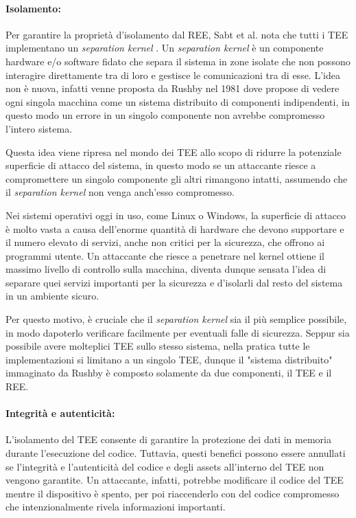 \documentclass[12pt,italian]{report}
\begin{document}
\paragraph{Isolamento:}
Per garantire la proprietà d'isolamento dal REE,
Sabt et al.\cite{sabt2015tee} nota
che tutti i TEE implementano un \textit{separation kernel}
\cite{rushby1981separationkernel}. 
Un \textit{separation kernel} è un componente hardware e/o software fidato che
separa il sistema in zone isolate che non possono
interagire direttamente tra di loro e gestisce le comunicazioni tra di esse.
L'idea non è nuova, infatti venne proposta da Rushby nel 1981 dove propose
di vedere ogni singola macchina come un sistema distribuito di componenti
indipendenti, in questo modo un errore in un singolo componente non avrebbe
compromesso l'intero sistema.

Questa idea viene ripresa nel mondo dei TEE allo scopo di ridurre la
potenziale superficie di attacco del sistema, in questo modo se un
attaccante riesce a compromettere un singolo componente gli altri rimangono
intatti, assumendo che il \textit{separation kernel} non venga anch'esso
compromesso.

Nei sistemi operativi oggi in uso, come Linux o Windows, la superficie di
attacco è molto vasta a causa dell'enorme quantità di hardware che devono
supportare e il numero elevato di servizi, anche non critici per la sicurezza,
che offrono ai programmi utente. 
Un attaccante che riesce a penetrare nel kernel ottiene il massimo livello di
controllo sulla macchina, diventa dunque sensata l'idea di separare quei
servizi importanti per la sicurezza e d'isolarli dal resto del sistema in
un ambiente sicuro.

Per questo motivo, è cruciale che il \textit{separation kernel} sia
il più semplice possibile, in modo dapoterlo verificare facilmente per
eventuali falle di sicurezza.
Seppur sia possibile avere molteplici TEE sullo stesso sistema, nella pratica
tutte le implementazioni si limitano a un singolo TEE, dunque il
"sistema distribuito" immaginato da Rushby è composto solamente da due
componenti, il TEE e il REE.

\paragraph{Integrità e autenticità:}
L'isolamento del TEE consente di garantire la protezione dei dati
in memoria durante l'esecuzione del codice.
Tuttavia, questi benefici possono essere annullati se l'integrità e
l'autenticità del codice e degli assets all'interno del TEE non vengono
garantite.
Un attaccante, infatti, potrebbe modificare il codice del TEE mentre il
dispositivo è spento, per poi riaccenderlo con del codice compromesso
che intenzionalmente rivela informazioni importanti.
\end{document}
